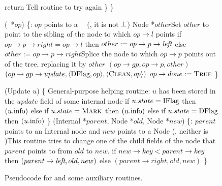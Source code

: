 \begin{figure*}
\begin{code}
		return \FALSE\tabtabcom Tell  routine to try again\nlc
		\p       \}\nlc
		\p
		\}\bl
		\nlc
		
		(\DFlag\ *$op$) \{\ul
		\n   {}:  $op$ points to a \DFlag\ \record\  (\ie, it is not $\mbox{$\bot$}$)\nlc
		Node *$other$\bl\ul
		\com Set $other$ to point to the sibling of the node to which  $op\rightarrow l$ points \nlc
		if $op\rightarrow p\rightarrow right = op\rightarrow l$ then $other := op\rightarrow p \rightarrow \mbox{\it left}$ else $other:=op\rightarrow p\rightarrow right$\label{read-other}\ul 
		\com Splice the node to which $op\rightarrow p$ points out of the tree, replacing it by $other$\nlc
		$(op\rightarrow gp, op\rightarrow p, other)$ \label{dchild-cas}\nlc
		\CASB$(op\rightarrow gp\rightarrow update, \langle \mbox{DFlag}, op\rangle, \langle \mbox{\sc Clean}, op\rangle)$ \label{dunflag-cas}\nlc
		\textcolor{blue}{$op \rightarrow done := \mbox{\sc True}$}  \nlc
		\p
		\}\bl\nlc
		
		(Update $u$) \{ \tabtabcom General-purpose helping routine\ul
		\n    {}:  $u$ has been stored in the $update$ field of some internal node\nlc
		if $u.state = \mbox{IFlag}$ then $(u.\mbox{info})$\label{call-HelpInsert}\nlc
		else if $u.state = \mbox{\sc Mark}$ then $(u.\mbox{info})$\label{call-hm2}\nlc
		else if $u.state = \mbox{DFlag}$ then $(u.\mbox{info})$\label{call-HelpDelete}\nlc
		\p
		\}\bl
		\nlc
		(Internal *$parent$, Node *$old$, Node *$new$) \{\label{CAS-Child}\ul
		\n  {}:  $parent$ points to an Internal node and $new$ points to a Node (\ie, neither is \NULL)\ul
		\com This routine tries to change one of the child fields of the node that $parent$ points to from $old$ to $new$.\nlc
		if $new \rightarrow key < parent\rightarrow key$ then\label{which-child}\nlc
		\n       \CASB$(parent\rightarrow \mbox{\it left}, old, new)$\label{child-cas-1}\nlc
		\p  else\nlc
		\n       \CASB$(parent\rightarrow right, old, new)$\label{child-cas-2}\nlc
		\p\p 
		\}
	\end{code}
	\caption{\label{code3}Pseudocode for  and some auxiliary routines.}
\end{figure*}